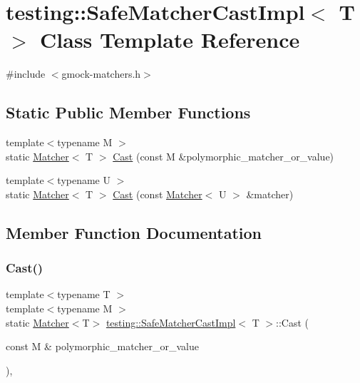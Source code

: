 \hypertarget{classtesting_1_1_safe_matcher_cast_impl}{}\section{testing\+:\+:Safe\+Matcher\+Cast\+Impl$<$ T $>$ Class Template Reference}
\label{classtesting_1_1_safe_matcher_cast_impl}


{\ttfamily \#include $<$gmock-\/matchers.\+h$>$}

\subsection*{Static Public Member Functions}
\begin{DoxyCompactItemize}
\item 
{\footnotesize template$<$typename M $>$ }\\static \hyperlink{classtesting_1_1_matcher}{Matcher}$<$ T $>$ \hyperlink{classtesting_1_1_safe_matcher_cast_impl_a6ceab2bd71bff1677ed184eb2afa8653}{Cast} (const M \&polymorphic\+\_\+matcher\+\_\+or\+\_\+value)
\item 
{\footnotesize template$<$typename U $>$ }\\static \hyperlink{classtesting_1_1_matcher}{Matcher}$<$ T $>$ \hyperlink{classtesting_1_1_safe_matcher_cast_impl_a034691f9eab929b8b25c33f13937ab95}{Cast} (const \hyperlink{classtesting_1_1_matcher}{Matcher}$<$ U $>$ \&matcher)
\end{DoxyCompactItemize}


\subsection{Member Function Documentation}
\mbox{\label{classtesting_1_1_safe_matcher_cast_impl_a6ceab2bd71bff1677ed184eb2afa8653}} 
\subsubsection{\texorpdfstring{Cast()}{Cast()}\hspace{0.1cm}{\footnotesize\ttfamily [1/2]}}
{\footnotesize\ttfamily template$<$typename T $>$ \\
template$<$typename M $>$ \\
static \hyperlink{classtesting_1_1_matcher}{Matcher}$<$T$>$ \hyperlink{classtesting_1_1_safe_matcher_cast_impl}{testing\+::\+Safe\+Matcher\+Cast\+Impl}$<$ T $>$\+::Cast (\begin{DoxyParamCaption}\item[{const M \&}]{polymorphic\+\_\+matcher\+\_\+or\+\_\+value }\end{DoxyParamCaption})\hspace{0.3cm}{\ttfamily [inline]}, {\ttfamily [static]}}

